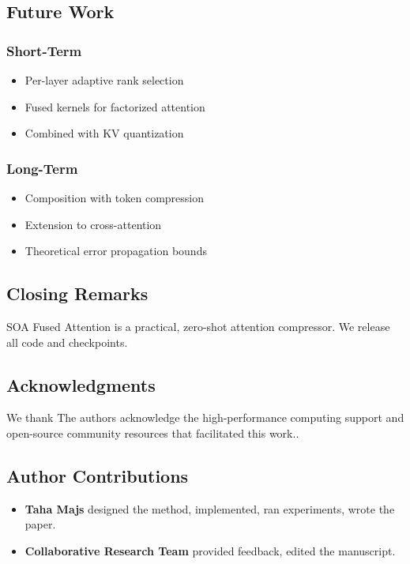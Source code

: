 \subsection{Future Work}

\subsubsection{Short-Term}
\begin{itemize}
\item Per-layer adaptive rank selection
\item Fused kernels for factorized attention
\item Combined with KV quantization

\end{itemize}
\subsubsection{Long-Term}
\begin{itemize}
\item Composition with token compression
\item Extension to cross-attention
\item Theoretical error propagation bounds

\end{itemize}
\subsection{Closing Remarks}

SOA Fused Attention is a practical, zero-shot attention compressor. We 
release all code and checkpoints.

\subsection{Acknowledgments}

We thank The authors acknowledge the high-performance computing support and open-source community resources that facilitated this work..

\subsection{Author Contributions}

\begin{itemize}
\item \textbf{Taha Majs} designed the method, implemented, ran experiments, wrote
  the paper.
\item \textbf{Collaborative Research Team} provided feedback, edited the manuscript.

\end{itemize}
